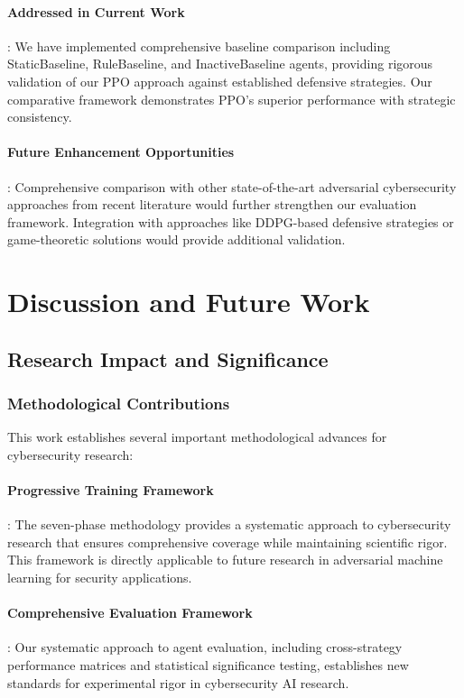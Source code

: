 \documentclass[12pt,oneside]{article}
\begin{document}
\paragraph{Addressed in Current Work}: We have implemented comprehensive baseline comparison including StaticBaseline, RuleBaseline, and InactiveBaseline agents, providing rigorous validation of our PPO approach against established defensive strategies. Our comparative framework demonstrates PPO's superior performance with strategic consistency.

\paragraph{Future Enhancement Opportunities}: Comprehensive comparison with other state-of-the-art adversarial cybersecurity approaches from recent literature would further strengthen our evaluation framework. Integration with approaches like DDPG-based defensive strategies or game-theoretic solutions would provide additional validation.



\clearpage
\section{Discussion and Future Work}

\subsection{Research Impact and Significance}

\subsubsection{Methodological Contributions}
This work establishes several important methodological advances for cybersecurity research:


\paragraph{Progressive Training Framework}: The seven-phase methodology provides a systematic approach to cybersecurity research that ensures comprehensive coverage while maintaining scientific rigor. This framework is directly applicable to future research in adversarial machine learning for security applications.

\paragraph{Comprehensive Evaluation Framework}: Our systematic approach to agent evaluation, including cross-strategy performance matrices and statistical significance testing, establishes new standards for experimental rigor in cybersecurity AI research.
\end{document}
